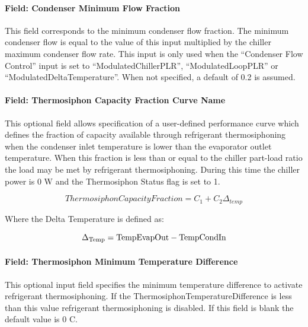 \paragraph{Field: Condenser Minimum Flow Fraction}

This field corresponds to the minimum condenser flow fraction. The minimum condenser flow is equal to the value of this input multiplied by the chiller maximum condenser flow rate. This input is only used when the ``Condenser Flow Control'' input is set to ``ModulatedChillerPLR'', ``ModulatedLoopPLR'' or ``ModulatedDeltaTemperature''. When not specified, a default of 0.2 is assumed.

\paragraph{Field: Thermosiphon Capacity Fraction Curve Name}\label{thermosiphon-capacity-fraction-curve-name1}

This optional field allows specification of a user-defined performance curve which defines the fraction of capacity available through refrigerant thermosiphoning when the condenser inlet temperature is lower than the evaporator outlet temperature. When this fraction is less than or equal to the chiller part-load ratio the load may be met by refrigerant thermosiphoning. During this time the chiller power is 0 W and the Thermosiphon Status flag is set to 1.

\begin{equation}
    ThermosiphonCapacityFraction = {C_1} + {C_2}{\Delta_{temp}}
\end{equation}

Where the Delta Temperature is defined as:

\begin{equation}
{\Delta_{{\rm{Temp}}}}
    = {\rm{TempEvapOut  -  TempCondIn }}
\end{equation}

\paragraph{Field: Thermosiphon Minimum Temperature Difference}\label{thermosiphon-minimum-temperature-difference1}

This optional input field specifies the minimum temperature difference to activate refrigerant thermosiphoning. If the ThermosiphonTemperatureDifference is less than this value refrigerant thermosiphoning is disabled. If this field is blank the default value is 0 C.



